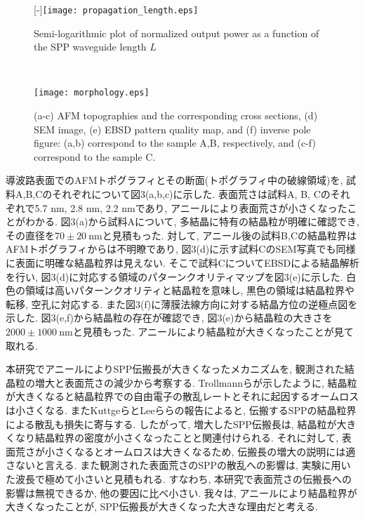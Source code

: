 \documentclass[a4,10truept]{jsarticle}
\begin{document}
\begin{wrapfigure}{r}[0mm]{0.4\hsize}
  \centering
\begin{minipage}{\hsize}
     \raisebox{0pt}[\dimexpr\height-\baselineskip\relax]{\texttt{[image: propagation\_length.eps]}}
    \caption{Semi-logarithmic plot of normalized output power as a function of the SPP waveguide length $L$}
       \label{fig:propagation_length}
\end{minipage}\\
\begin{minipage}{\hsize}
     \texttt{[image: morphology.eps]}
        \caption{(a-c) AFM topographies and the corresponding cross sections, (d) SEM image, (e) EBSD pattern quality map, and (f) inverse pole figure: (a,b) correspond to the sample A,B, respectively, and (c-f) correspond to the sample C.}
    \label{fig:morphology}
\end{minipage}
\end{wrapfigure}
導波路表面でのAFMトポグラフィとその断面(トポグラフィ中の破線領域)を, 試料A,B,Cのそれぞれについて図3(a,b,c)に示した. 表面荒さは試料A, B, Cのそれぞれで5.7 nm, 2.8 nm, 2.2 nmであり, アニールにより表面荒さが小さくなったことがわかる. 図3(a)から試料Aについて, 多結晶に特有の結晶粒が明確に確認でき, その直径を$70\pm20\:\mathrm{nm}$と見積もった. 対して, アニール後の試料B,Cの結晶粒界はAFMトポグラフィからは不明瞭であり, 図3(d)に示す試料CのSEM写真でも同様に表面に明確な結晶粒界は見えない. そこで試料CについてEBSDによる結晶解析を行い, 図3(d)に対応する領域のパターンクオリティマップを図3(e)に示した. 白色の領域は高いパターンクオリティと結晶粒を意味し, 黒色の領域は結晶粒界や転移, 空孔に対応する. また図3(f)に薄膜法線方向に対する結晶方位の逆極点図を示した. 図3(e,f)から結晶粒の存在が確認でき, 図3(e)から結晶粒の大きさを$2000\pm1000\:\mathrm{nm}$と見積もった. アニールにより結晶粒が大きくなったことが見て取れる. 

本研究でアニールによりSPP伝搬長が大きくなったメカニズムを, 観測された結晶粒の増大と表面荒さの減少から考察する. Trollmannら\cite{Trollmann}が示したように, 結晶粒が大きくなると結晶粒界での自由電子の散乱レートとそれに起因するオームロスは小さくなる. またKuttgeら\cite{Kuttge}とLeeら\cite{Lee}らの報告によると, 伝搬するSPPの結晶粒界による散乱も損失に寄与する. したがって, 増大したSPP伝搬長は, 結晶粒が大きくなり結晶粒界の密度が小さくなったことと関連付けられる. それに対して, 表面荒さが小さくなるとオームロスは大きくなるため\cite{Trollmann}, 伝搬長の増大の説明には適さないと言える. また観測された表面荒さのSPPの散乱への影響は, 実験に用いた波長で極めて小さいと見積もれる\cite{Mills}. すなわち, 本研究で表面荒さの伝搬長への影響は無視できるか, 他の要因に比べ小さい. 我々は, アニールにより結晶粒界が大きくなったことが, SPP伝搬長が大きくなった大きな理由だと考える.
\end{document}
